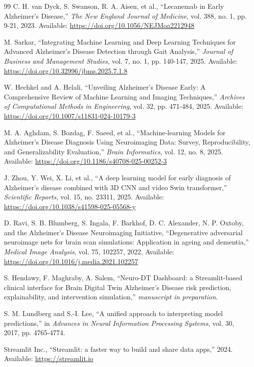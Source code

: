 \documentclass[pdflatex,sn-mathphys-num]{sn-jnl}%
\theoremstyle{thmstyleone}%
\theoremstyle{thmstyletwo}%
\theoremstyle{thmstylethree}%
\begin{document}
\begin{thebibliography}{99}
 C. H. van Dyck, S. Swanson, R. A. Aisen, et al., ``Lecanemab in Early Alzheimer's Disease,'' \textit{The New England Journal of Medicine}, vol. 388, no. 1, pp. 9-21, 2023. Available: \url{https://doi.org/10.1056/NEJMoa2212948}

 M. Sarkar, ``Integrating Machine Learning and Deep Learning Techniques for Advanced Alzheimer's Disease Detection through Gait Analysis,'' \textit{Journal of Business and Management Studies}, vol. 7, no. 1, pp. 140-147, 2025. Available: \url{https://doi.org/10.32996/jbms.2025.7.1.8}

 W. Hechkel and A. Helali, ``Unveiling Alzheimer's Disease Early: A Comprehensive Review of Machine Learning and Imaging Techniques,'' \textit{Archives of Computational Methods in Engineering}, vol. 32, pp. 471-484, 2025. Available: \url{https://doi.org/10.1007/s11831-024-10179-3}

 M. A. Aghdam, S. Bozdag, F. Saeed, et al., ``Machine-learning Models for Alzheimer's Disease Diagnosis Using Neuroimaging Data: Survey, Reproducibility, and Generalizability Evaluation,'' \textit{Brain Informatics}, vol. 12, no. 8, 2025. Available: \url{https://doi.org/10.1186/s40708-025-00252-3}

 J. Zhou, Y. Wei, X. Li, et al., ``A deep learning model for early diagnosis of Alzheimer's disease combined with 3D CNN and video Swin transformer,'' \textit{Scientific Reports}, vol. 15, no. 23311, 2025. Available: \url{https://doi.org/10.1038/s41598-025-05568-y}

 D. Ravi, S. B. Blumberg, S. Ingala, F. Barkhof, D. C. Alexander, N. P. Oxtoby, and the Alzheimer's Disease Neuroimaging Initiative, ``Degenerative adversarial neuroimage nets for brain scan simulations: Application in ageing and dementia,'' \textit{Medical Image Analysis}, vol. 75, 102257, 2022. Available: \url{https://doi.org/10.1016/j.media.2021.102257}

 S. Hendawy, F. Maghraby, A. Salem, ``Neuro-DT Dashboard: a Streamlit-based clinical interface for Brain Digital Twin Alzheimer's Disease risk prediction, explainability, and intervention simulation,'' \textit{manuscript in preparation}. %

 S. M. Lundberg and S.-I. Lee, ``A unified approach to interpreting model predictions,'' in \textit{Advances in Neural Information Processing Systems}, vol. 30, 2017, pp. 4765-4774.

 Streamlit Inc., ``Streamlit: a faster way to build and share data apps,'' 2024. Available: \url{https://streamlit.io}

\end{thebibliography}
\end{document}
